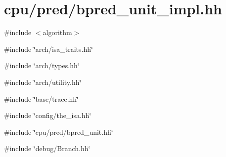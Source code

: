 \hypertarget{bpred__unit__impl_8hh}{
\section{cpu/pred/bpred\_\-unit\_\-impl.hh}
\label{bpred__unit__impl_8hh}
}
{\ttfamily \#include $<$algorithm$>$}\par
{\ttfamily \#include \char`\"{}arch/isa\_\-traits.hh\char`\"{}}\par
{\ttfamily \#include \char`\"{}arch/types.hh\char`\"{}}\par
{\ttfamily \#include \char`\"{}arch/utility.hh\char`\"{}}\par
{\ttfamily \#include \char`\"{}base/trace.hh\char`\"{}}\par
{\ttfamily \#include \char`\"{}config/the\_\-isa.hh\char`\"{}}\par
{\ttfamily \#include \char`\"{}cpu/pred/bpred\_\-unit.hh\char`\"{}}\par
{\ttfamily \#include \char`\"{}debug/Branch.hh\char`\"{}}\par
